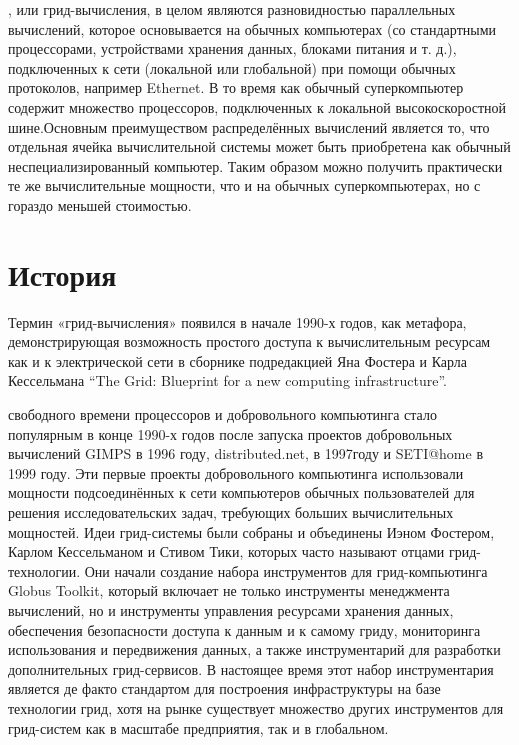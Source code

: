 \documentclass[och, referat]{SCWorks}
\begin{document}
, или грид-вычисления, в целом являются разновидностью параллельных вычислений, которое основывается на обычных компьютерах (со стандартными процессорами, устройствами хранения данных, блоками питания и т. д.), подключенных к сети (локальной или глобальной) при помощи обычных протоколов, например Ethernet. В то время как обычный суперкомпьютер содержит множество процессоров, подключенных к локальной высокоскоростной шине.Основным преимуществом распределённых вычислений является то, что отдельная ячейка вычислительной системы может быть приобретена как обычный неспециализированный компьютер. Таким образом можно получить практически те же вычислительные мощности, что и на обычных суперкомпьютерах, но с гораздо меньшей стоимостью.


\section{История}
Термин «грид-вычисления» появился в начале 1990-х годов, как метафора, демонстрирующая возможность простого доступа к вычислительным ресурсам как и к электрической сети в сборнике подредакцией Яна Фостера и Карла Кессельмана “The Grid: Blueprint for a new computing infrastructure”\cite{bib:gridblueprint}.

 свободного времени процессоров и добровольного компьютинга стало популярным в конце 1990-х годов после запуска проектов добровольных вычислений GIMPS\cite{bib:gimps} в 1996 году, distributed.net\cite{bib:distributed}, в 1997году и SETI@home\cite{bib:seti} в 1999 году. Эти первые проекты добровольного компьютинга использовали мощности подсоединённых к сети компьютеров обычных пользователей для решения исследовательских задач, требующих больших вычислительных мощностей.
Идеи грид-системы были собраны и объединены Иэном Фостером, Карлом Кессельманом и Стивом Тики, которых часто называют отцами грид-технологии. Они начали создание набора инструментов для грид-компьютинга Globus Toolkit\cite{ bib:globus}, который включает не только инструменты менеджмента вычислений, но и инструменты управления ресурсами  хранения данных, обеспечения безопасности доступа к данным и к самому гриду, мониторинга использования и передвижения данных, а также инструментарий для разработки дополнительных грид-сервисов. В настоящее время этот набор инструментария является де факто стандартом для построения инфраструктуры на базе технологии грид, хотя на рынке существует множество других инструментов для грид-систем как в масштабе предприятия, так и в глобальном.
\end{document}
